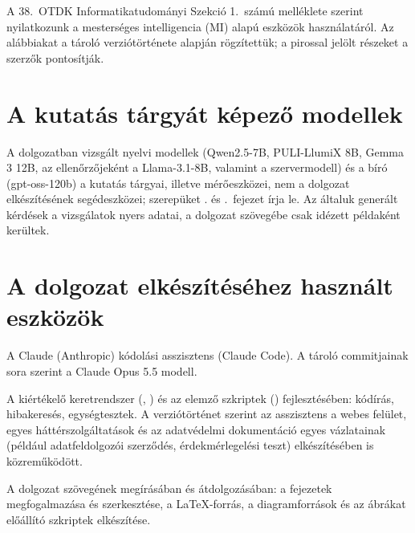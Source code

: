 A 38.~OTDK Informatikatudományi Szekció 1.~számú melléklete szerint nyilatkozunk a mesterséges intelligencia
(MI) alapú eszközök használatáról. Az alábbiakat a tároló verziótörténete alapján rögzítettük; a pirossal
jelölt részeket a szerzők pontosítják.

\section{A kutatás tárgyát képező modellek}

A dolgozatban vizsgált nyelvi modellek (Qwen2.5-7B, PULI-LlumiX 8B, Gemma 3 12B, az  ellenőrzőjeként a
Llama-3.1-8B, valamint a szervermodell) és a bíró (gpt-oss-120b) a kutatás tárgyai, illetve mérőeszközei, nem a
dolgozat elkészítésének segédeszközei; szerepüket \az{\ref{ch:modszer}}. és \az{\ref{ch:kiertekeles}}.~fejezet
írja le. Az általuk generált kérdések a vizsgálatok nyers adatai, a dolgozat szövegébe csak idézett példaként
kerültek.

\section{A dolgozat elkészítéséhez használt eszközök}

\begin{sloppypar}
\begin{description}[style=nextline,leftmargin=0.6cm]
\item[Eszköz] A Claude (Anthropic) kódolási asszisztens (Claude Code). A tároló commitjainak
 sora szerint a Claude Opus 5.5 modell. 
\item[Szoftverfejlesztés] A kiértékelő keretrendszer (, ) és az elemző
szkriptek () fejlesztésében: kódírás, hibakeresés, egységtesztek. A verziótörténet szerint az
asszisztens a webes felület, egyes háttérszolgáltatások és az adatvédelmi dokumentáció egyes vázlatainak
(például adatfeldolgozói szerződés, érdekmérlegelési teszt) elkészítésében is közreműködött. 
\item[A dolgozat szövege] A dolgozat szövegének megírásában és átdolgozásában: a fejezetek megfogalmazása és
szerkesztése, a LaTeX-forrás, a diagramforrások és az ábrákat előállító szkriptek elkészítése. 
\item[Mérték] 
\item[Más eszközök] 
\end{description}
\end{sloppypar}

